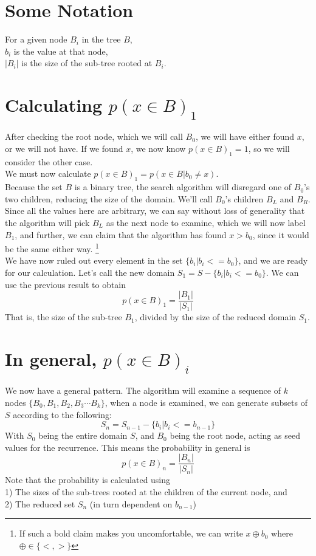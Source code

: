 \documentclass[10pt,a4paper]{article}
\begin{document}
\section*{Some Notation}
For a given node $B_i$ in the tree $B$,\\
$b_i$ is the value at that node,\\
$|B_i|$ is the size of the sub-tree rooted at $B_i$.
\section*{Calculating $p(x \in B)_1$}
After checking the root node, which we will call $B_0$, we will have either found $x$, or we will not have. If we found $x$, we now know $p(x \in B)_1 = 1$, so we will consider the other case.\\
We must now calculate $p(x \in B)_1 = p(x \in B | b_0 \neq x)$.\\
Because the set $B$ is a binary tree, the search algorithm will disregard one of $B_0$'s two children, reducing the size of the domain. We'll call $B_0$'s children $B_L$ and $B_R$. Since all the values here are arbitrary, we can say without loss of generality that the algorithm will pick $B_L$ as the next node to examine, which we will now label $B_1$, and further, we can claim that the algorithm has found $x > b_0$, since it would be the same either way.
\footnote{If such a bold claim makes you uncomfortable, we can write $x \oplus b_0$ where $\oplus \in \{<, >\}$}\\
We have now ruled out every element in the set $\{b_i | b_i <= b_0\}$, and we are ready for our calculation. Let's call the new domain $S_1 = S - \{b_i | b_i <= b_0 \}$. We can use the previous result to obtain
$$p(x \in B)_1 = \frac{|B_1|}{|S_1|}$$
That is, the size of the sub-tree $B_1$, divided by the size of the reduced domain $S_1$.
\section*{In general, $p(x \in B)_i$}
We now have a general pattern. The algorithm will examine a sequence of $k$ nodes $\{B_0, B_1, B_2, B_3 \cdots B_k\}$, when a node is examined, we can generate subsets of $S$ according to the following:
$$S_n = S_{n-1} - \{b_i | b_i <= b_{n-1} \}$$
With $S_0$ being the entire domain $S$, and $B_0$ being the root node, acting as seed values for the recurrence. This means the probability in general is
$$p(x \in B)_n = \frac{|B_{n}|}{|S_n|}$$
Note that the probability is calculated using\\
1) The sizes of the sub-trees rooted at the children of the current node, and\\
2) The reduced set $S_n$ (in turn dependent on $b_{n-1}$)
\pagebreak
\end{document}
